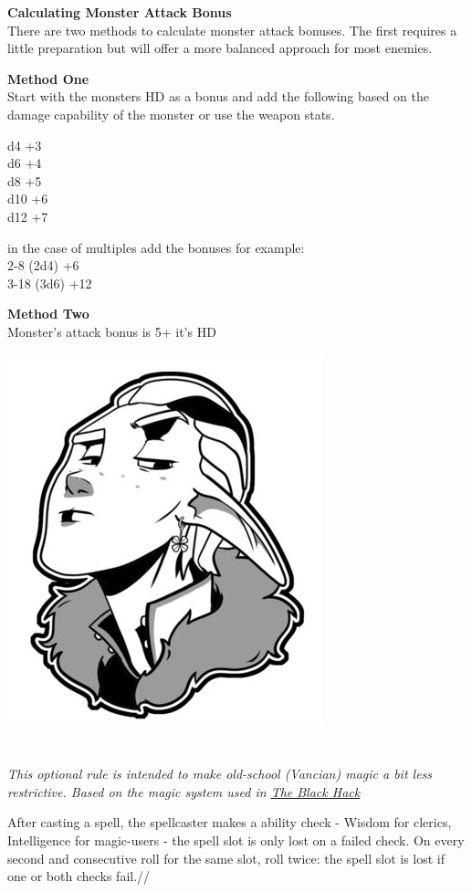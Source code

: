 \documentclass[letterpaper,sansserif,tightsqueeze]{rpg-module}
\begin{document}
\textbf{Calculating Monster Attack Bonus}\\
There are two methods to calculate monster attack bonuses. The first requires a little preparation but will offer a more balanced approach for most enemies.

\textbf{Method One}\\
Start with the monsters HD as a bonus and add the following based on the damage capability of the monster or use the weapon stats.

d4 +3\\
d6 +4\\
d8 +5\\
d10 +6\\
d12 +7

in the case of multiples add the bonuses for example:\\
2-8 (2d4) +6\\
3-18 (3d6) +12

\textbf{Method Two}\\
Monster’s attack bonus is 5+ it’s HD

\vspace{0.5cm}

\begin{center}
	\includegraphics[width = 0.3\linewidth]{shame_elf.jpg}
\end{center}
\section*{}
\textit{This optional rule is intended to make old-school (Vancian) magic a bit less restrictive. Based on the magic system used in \href{https://www.drivethrurpg.com/product/255088/The-Black-Hack-Second-Edition}{The Black Hack}}

After casting a spell, the spellcaster makes a ability check - Wisdom for clerics, Intelligence for magic-users - the spell slot is only lost on a failed check. On every second and consecutive roll for the same slot, roll twice: the spell slot is lost if one or both checks fail.//
\end{document}
